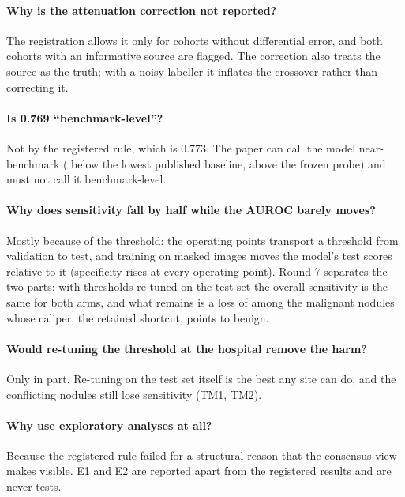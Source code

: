 \paragraph{Why is the attenuation correction not reported?} The registration allows it only for cohorts without
differential error, and both cohorts with an informative source are flagged. The correction also treats the source as
the truth; with a noisy labeller it inflates the crossover rather than correcting it.
\paragraph{Is 0.769 ``benchmark-level''?} Not by the registered rule, which is 0.773. The paper can call the model
near-benchmark (\sEightFTZeroGap{} below the lowest published baseline, above the frozen probe) and must not call it
benchmark-level.
\paragraph{Why does sensitivity fall by half while the AUROC barely moves?} Mostly because of the threshold: the
operating points transport a threshold from validation to test, and training on masked images moves the model's test
scores relative to it (specificity rises at every operating point). Round 7 separates the two parts: with thresholds
re-tuned on the test set the overall sensitivity is the same for both arms, and what remains is a loss of \sEightTMOne{}
among the malignant nodules whose caliper, the retained shortcut, points to benign.
\paragraph{Would re-tuning the threshold at the hospital remove the harm?} Only in part. Re-tuning on the test set itself
is the best any site can do, and the conflicting nodules still lose sensitivity (TM1, TM2).
\paragraph{Why use exploratory analyses at all?} Because the registered rule failed for a structural reason that the
consensus view makes visible. E1 and E2 are reported apart from the registered results and are never tests.

